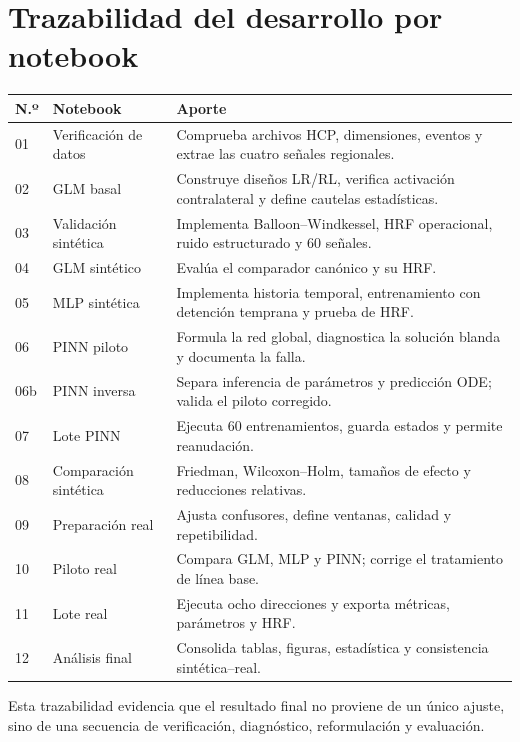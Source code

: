 \chapter{Trazabilidad del desarrollo por notebook}

\begin{longtable}{p{}p{}p{}}
\toprule
\textbf{N.º} & \textbf{Notebook} & \textbf{Aporte}\\
\midrule
01 & Verificación de datos & Comprueba archivos HCP, dimensiones, eventos y extrae las cuatro señales regionales.\\
02 & GLM basal & Construye diseños LR/RL, verifica activación contralateral y define cautelas estadísticas.\\
03 & Validación sintética & Implementa Balloon--Windkessel, HRF operacional, ruido estructurado y 60 señales.\\
04 & GLM sintético & Evalúa el comparador canónico y su HRF.\\
05 & MLP sintética & Implementa historia temporal, entrenamiento con detención temprana y prueba de HRF.\\
06 & PINN piloto & Formula la red global, diagnostica la solución blanda y documenta la falla.\\
06b & PINN inversa & Separa inferencia de parámetros y predicción ODE; valida el piloto corregido.\\
07 & Lote PINN & Ejecuta 60 entrenamientos, guarda estados y permite reanudación.\\
08 & Comparación sintética & Friedman, Wilcoxon--Holm, tamaños de efecto y reducciones relativas.\\
09 & Preparación real & Ajusta confusores, define ventanas, calidad y repetibilidad.\\
10 & Piloto real & Compara GLM, MLP y PINN; corrige el tratamiento de línea base.\\
11 & Lote real & Ejecuta ocho direcciones y exporta métricas, parámetros y HRF.\\
12 & Análisis final & Consolida tablas, figuras, estadística y consistencia sintética--real.\\
\bottomrule
\end{longtable}

Esta trazabilidad evidencia que el resultado final no proviene de un único ajuste, sino de una secuencia de verificación, diagnóstico, reformulación y evaluación.

